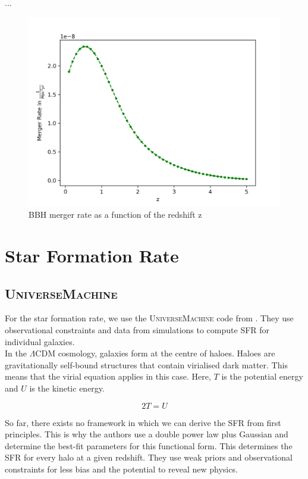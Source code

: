 ...

\begin{figure}[h]
    \centering
    \includegraphics[width=1\linewidth]{Images/bbh_merger_rate.png}
    \caption{BBH merger rate as a function of the redshift z}
    \label{bbh_merger_rate}
   \end{figure} 

\section{Star Formation Rate}
\subsection{\textsc{UniverseMachine}}

For the star formation rate, we use the \textsc{UniverseMachine} code from \cite{behroozi_universemachine_2019}. They use observational constraints and data from simulations to compute SFR for individual galaxies. \\

In the $\Lambda$CDM cosmology, galaxies form at the centre of haloes. Haloes are gravitationally self-bound structures that contain virialised dark matter. This means that the virial equation applies in this case. Here, $T$ is the potential energy and $U$ is the kinetic energy.

\begin{equation}
    2T=U
\end{equation}

So far, there exists no framework in which we can derive the SFR from first principles. This is why the authors use a double power law plus Gaussian and determine the best-fit parameters for this functional form. This determines the SFR for every halo at a given redshift. They use weak priors and observational constraints for less bias and the potential to reveal new physics.

